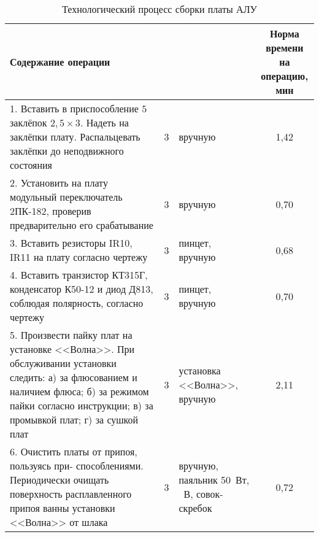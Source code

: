 \begin{table} [h!]
  \caption{
    Технологический процесс сборки платы АЛУ
  }\label{tbl:assembly_process}
  {\small
    \begin{tabular}{| m{10cm} | c | m{3cm} | c |}
      \hline
      Содержание операции &
      \rotatebox[origin=c]{90}{\hspace{2mm}\parbox{3.3cm}{Разряд работ}} &
      \rotatebox[origin=c]{90}{\hspace{2mm}\parbox{3.3cm}{Приспособление, инструмент, оборудование}} &
      \rotatebox[origin=c]{90}{\hspace{2mm}\parbox{3.3cm}{Норма времени \\ на операцию, \\ мин}} \\ \hline

      1. Вставить в приспособление $5$ заклёпок $2{,}5 \times 3$. Надеть на
      заклёпки плату. Распальцевать заклёпки до неподвижного состояния &
      3 & вручную & 1,42 \\ \hline

      2. Установить на плату модульный переключатель 2ПК-182, проверив
      предварительно его срабатывание &
      3 & вручную & 0,70 \\ \hline

      3. Вставить резисторы IR10, IR11 на плату согласно чертежу &
      3 & пинцет, вручную & 0,68 \\ \hline

      4. Вставить транзистор КТ315Г, конденсатор К50-12 и диод Д813, соблюдая
      полярность, согласно чертежу &
      3 & пинцет, вручную & 0,70 \\ \hline

      5. Произвести пайку плат на установке <<Волна>>. \newline
      При обслуживании установки следить: \newline
      а) за флюсованием и наличием флюса; \newline
      б) за режимом пайки согласно инструкции; \newline
      в) за промывкой плат; \newline
      г) за сушкой плат &
      3 & установка <<Волна>>, вручную & 2,11 \\ \hline

      6. Очистить платы от припоя, пользуясь при- способлениями. Периодически очищать
      поверхность расплавленного припоя ванны установки <<Волна>> от шлака &
      3 & вручную, паяльник 50~Вт, \newline 36~В, совок- \newline скребок & 0,72 \\ \hline


\end{tabular}}
\end{table}
